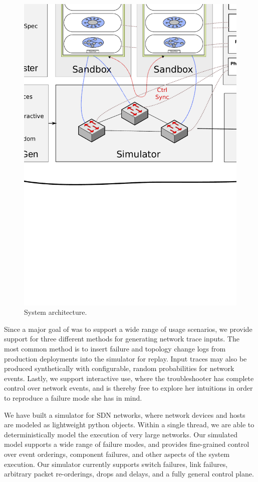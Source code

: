 {\begin{figure}[!t]
  \centering
  \includegraphics[width=0.8\textwidth{}]{../diagrams/architecture/architecture.pdf}
  \caption{System architecture. }
  \label{fig:system}
\end{figure}

 Since a major goal of \projectname{} was
to support a wide range of usage scenarios, %
we provide support for three different methods for generating network trace
inputs. The most common method is to insert failure and topology change logs
from production deployments into the simulator for replay. Input traces may
also be produced synthetically with configurable, random probabilities for
network events. Lastly, we support interactive use, where the troubleshooter
has complete control over network events, and is thereby free to explore her
intuitions in order to reproduce a failure mode she has in mind.

 We have built a simulator for SDN networks,
where network devices and hosts are modeled as lightweight python objects.
 Within a single thread, we
are able to deterministically model the execution of very large networks.
Our simulated model supports a wide
range of failure modes, and provides fine-grained control over event
orderings, component failures, and other aspects of the system execution. Our
simulator currently supports switch failures, link failures, arbitrary packet
re-orderings, drops and delays, and a fully general control plane.

}
